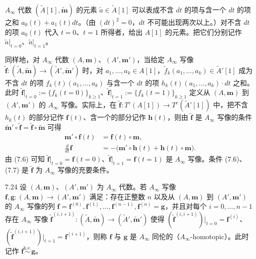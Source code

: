 $A_\infty$ 代数 $(\tilde A[1],\tilde{\mathbf m})$ 的元素 $\tilde a\in\tilde A[1]$ 可以表成不含 $dt$ 的项与含一个 $dt$ 的项之和 $a_{0}(t)+a_{1}(t)dt$。（由 $(dt)^{2}=0$，$dt$ 不可能出现两次以上。）对不含 $dt$ 的项 $a_{0}(t)$ 代入 $t=0$、$t=1$ 所得者，给出 $A[1]$ 的元素。把它们分别记作 $\tilde a|_{t=0}$、$\tilde a|_{t=1}$。

同样地，对 $A_\infty$ 代数 $(A,\mathbf m)$、$(A',\mathbf m')$，当给定 $A_\infty$ 写像 $\tilde{\mathbf f}\colon(\tilde A,\tilde{\mathbf m})\to(\tilde A',\tilde{\mathbf m}')$ 时，对 $a_{1},\dots,a_{k}\in A[1]$，$\tilde f_{k}(a_{1},\dots,a_{k})\in\tilde A'[1]$ 成为不含 $dt$ 的项 $f_{k}(t)(a_{1},\dots,a_{k})$ 与含一个 $dt$ 的项 $h_{k}(t)(a_{1},\dots,a_{k})\cdot dt$ 之和。此时 $\tilde{\mathbf f}|_{t=0}:=\{f_{k}(t=0)\}_{k\ge 1}$、$\tilde{\mathbf f}|_{t=1}:=\{f_{k}(t=1)\}_{k\ge 1}$ 定义从 $(A,\mathbf m)$ 到 $(A',\mathbf m')$ 的 $A_\infty$ 写像。实际上，在 $\tilde{\mathbf f}\colon T^{c}(A[1])\to T^{c}(\tilde A'[1])$ 中，把不含 $h_{k}(t)$ 的部分记作 $\mathbf f(t)$、含一个的部分记作 $\mathbf h(t)$，则由 $\tilde{\mathbf f}$ 是 $A_\infty$ 写像的条件 $\tilde{\mathbf m}'\circ\tilde{\mathbf f}=\tilde{\mathbf f}\circ\tilde{\mathbf m}$ 可得
\begin{align}
  \mathbf m'\circ\mathbf f(t)&=\mathbf f(t)\circ\mathbf m, \tag{7.6}\\
  \frac{d}{dt}\mathbf f&=-\bigl(\mathbf m'\circ\mathbf h(t)+\mathbf h(t)\circ\mathbf m\bigr). \tag{7.7}
\end{align}
由 (7.6) 可知 $\tilde{\mathbf f}|_{t=0}=\mathbf f(t=0)$、$\tilde{\mathbf f}|_{t=1}=\mathbf f(t=1)$ 是 $A_\infty$ 写像。条件 (7.6)、(7.7) 是 $\tilde{\mathbf f}$ 为 $A_\infty$ 写像的充要条件。


\begin{definition}{7.24}
设 $(A,\mathbf m)$、$(A',\mathbf m')$ 为 $A_\infty$ 代数。若 $A_\infty$ 写像 $\mathbf f,\mathbf g\colon(A,\mathbf m)\to(A',\mathbf m')$ 满足：存在正整数 $n$ 以及从 $(A,\mathbf m)$ 到 $(A',\mathbf m')$ 的 $A_\infty$ 写像的列 $\mathbf f=\mathbf f^{(0)},\mathbf f^{(1)},\dots,\mathbf f^{(n-1)},\mathbf f^{(n)}=\mathbf g$，并且对每个 $i=0,\dots,n-1$ 存在 $A_\infty$ 写像 $\tilde{\mathbf f}^{(i,i+1)}\colon(\tilde A,\tilde{\mathbf m})\to(\tilde A',\tilde{\mathbf m}')$ 使得 $(\tilde{\mathbf f}^{(i,i+1)})|_{t=0}=\mathbf f^{(i)}$、$(\tilde{\mathbf f}^{(i,i+1)})|_{t=1}=\mathbf f^{(i+1)}$，则称 $\mathbf f$ 与 $\mathbf g$ 是 $A_\infty$ 同伦的（$A_\infty$-homotopic）。此时记作 $\mathbf f\overset{\mathrm{h.e.}}{\sim}\mathbf g$。
\end{definition}

